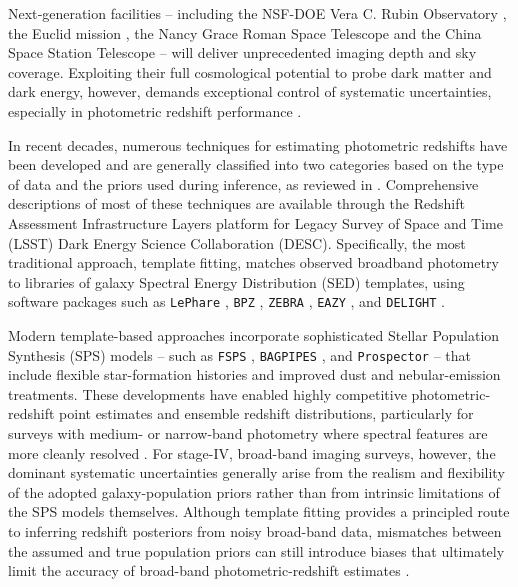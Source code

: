 Next‐generation facilities -- including the NSF-DOE Vera C. Rubin Observatory \citep[\textit{Rubin}\footnote{\url{https://rubinobservatory.org}};][]{2009arXiv0912.0201L}, the Euclid mission \citep[\textit{Euclid}\footnote{\url{https://www.cosmos.esa.int/web/euclid}};][]{2025A&A...697A...1E}, the Nancy Grace Roman Space Telescope \citep[\textit{Roman}\footnote{\url{https://roman.gsfc.nasa.gov}};][]{2015arXiv150303757S} and the China Space Station Telescope \citep[CSST\footnote{\url{http://www.bao.ac.cn/csst/}};][]{2019ApJ...883..203G} -- will deliver unprecedented imaging depth and sky coverage. Exploiting their full cosmological potential to probe dark matter and dark energy, however, demands exceptional control of systematic uncertainties, especially in photometric redshift performance \citep{2018ARA&A..56..393M}.

In recent decades, numerous techniques for estimating photometric redshifts have been developed and are generally classified into two categories based on the type of data and the priors used during inference, as reviewed in \citet{2022ARA&A..60..363N}. Comprehensive descriptions of most of these techniques are available through the Redshift Assessment Infrastructure Layers \citep[\texttt{RAIL}\footnote{\url{https://github.com/LSSTDESC/rail}};][]{2025arXiv250502928T} platform for Legacy Survey of Space and Time (LSST) Dark Energy Science Collaboration (DESC). Specifically, the most traditional approach, template fitting, matches observed broadband photometry to libraries of galaxy Spectral Energy Distribution (SED) templates, using software packages such as \texttt{LePhare} \citep{1999MNRAS.310..540A,2006A&A...457..841I}, \texttt{BPZ} \citep{2000ApJ...536..571B, 2006AJ....132..926C}, \texttt{ZEBRA} \citep{2006MNRAS.372..565F}, \texttt{EAZY} \citep{2008ApJ...686.1503B}, and \texttt{DELIGHT} \citep{2017ApJ...838....5L}. 

Modern template-based approaches incorporate sophisticated Stellar Population Synthesis (SPS) models -- such as \texttt{FSPS} \citep{2009ApJ...699..486C, 2010ApJ...708...58C, 2010ApJ...712..833C}, \texttt{BAGPIPES} \citep{2018MNRAS.480.4379C}, and \texttt{Prospector} \citep{2021ApJS..254...22J} -- that include flexible star-formation histories and improved dust and nebular-emission treatments. These developments have enabled highly competitive photometric-redshift point estimates and ensemble redshift distributions, particularly for surveys with medium- or narrow-band photometry where spectral features are more cleanly resolved \citep[e.g.][]{2009ApJ...690.1250S, 2011ApJ...742...61S, 2021MNRAS.501.6103A}. For stage-IV, broad-band imaging surveys, however, the dominant systematic uncertainties generally arise from the realism and flexibility of the adopted galaxy-population priors rather than from intrinsic limitations of the SPS models themselves. Although template fitting provides a principled route to inferring redshift posteriors from noisy broad-band data, mismatches between the assumed and true population priors can still introduce biases that ultimately limit the accuracy of broad-band photometric-redshift estimates \citep[e.g.][]{2010A&A...523A..31H,2013ApJ...775...93D}.


